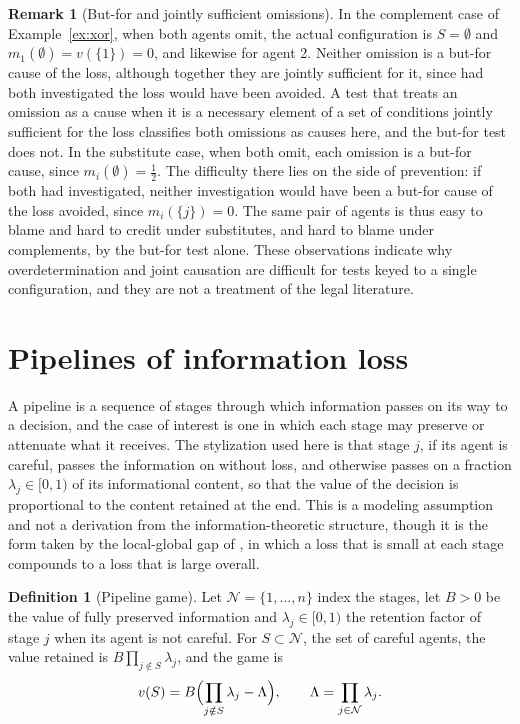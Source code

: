 \documentclass[11pt]{article}
\newcommand{\N}{\mathcal N}
\theoremstyle{plain}
\theoremstyle{definition}
\newtheorem{definition}{Definition}
\newtheorem{remark}{Remark}
\begin{document}
\begin{remark}[But-for and jointly sufficient omissions]\label{rem:butfor}
In the complement case of Example~\ref{ex:xor}, when both agents omit, the actual configuration is $S=\emptyset$ and $m_1(\emptyset)=v(\{1\})=0$, and likewise for agent 2. Neither omission is a but-for cause of the loss, although together they are jointly sufficient for it, since had both investigated the loss would have been avoided. A test that treats an omission as a cause when it is a necessary element of a set of conditions jointly sufficient for the loss \cite{wright1985causation,hart1959causation} classifies both omissions as causes here, and the but-for test does not. In the substitute case, when both omit, each omission is a but-for cause, since $m_i(\emptyset)=\tfrac12$. The difficulty there lies on the side of prevention: if both had investigated, neither investigation would have been a but-for cause of the loss avoided, since $m_i(\{j\})=0$. The same pair of agents is thus easy to blame and hard to credit under substitutes, and hard to blame under complements, by the but-for test alone. These observations indicate why overdetermination and joint causation are difficult for tests keyed to a single configuration, and they are not a treatment of the legal literature.
\end{remark}

\section{Pipelines of information loss}\label{sec:pipeline}

A pipeline is a sequence of stages through which information passes on its way to a decision, and the case of interest is one in which each stage may preserve or attenuate what it receives. The stylization used here is that stage $j$, if its agent is careful, passes the information on without loss, and otherwise passes on a fraction $\lambda_j\in[0,1)$ of its informational content, so that the value of the decision is proportional to the content retained at the end. This is a modeling assumption and not a derivation from the information-theoretic structure, though it is the form taken by the local-global gap of \cite{flyxion2026inputs}, in which a loss that is small at each stage compounds to a loss that is large overall.

\begin{definition}[Pipeline game]\label{def:pipe}
Let $\N=\{1,\dots,n\}$ index the stages, let $B>0$ be the value of fully preserved information and $\lambda_j\in[0,1)$ the retention factor of stage $j$ when its agent is not careful. For $S\subset\N$, the set of careful agents, the value retained is $B\prod_{j\notin S}\lambda_j$, and the game is
\[
v(S)=B\Bigl(\prod_{j\notin S}\lambda_j-\Lambda\Bigr),\qquad\Lambda=\prod_{j\in\N}\lambda_j.
\]
\end{definition}
\end{document}
